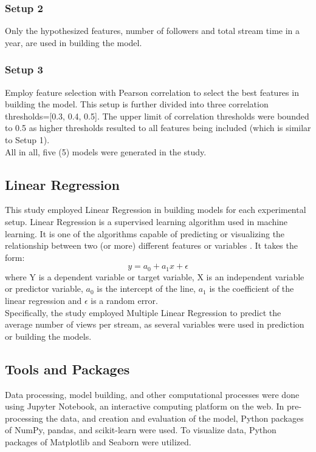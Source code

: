 \documentclass[runningheads]{llncs}
\begin{document}
\subsubsection{Setup 2} Only the hypothesized features, number of followers and total stream time in a year, are used in building the model.

\subsubsection{Setup 3} Employ feature selection with Pearson correlation to select the best features in building the model. This setup is further divided into three correlation thresholds=[0.3, 0.4, 0.5]. The upper limit of correlation thresholds were bounded to 0.5 as higher thresholds resulted to all features being included (which is similar to Setup 1). \\

All in all, five (5) models were generated in the study. 

\subsection{Linear Regression}
This study employed Linear Regression in building models for each experimental setup. Linear Regression is a supervised learning algorithm used in machine learning. It is one of the algorithms capable of predicting or visualizing the relationship between two (or more) different features or variables \cite{nelson_2021}. It takes the form:
\begin{equation}y=a_0+a_1x+\epsilon\end{equation}
where Y is a dependent variable or target variable, X is an independent variable or predictor variable, $a_0$ is the intercept of the line, $a_1$ is the coefficient of the linear regression and $\epsilon$ is a random error.  \\

Specifically, the study employed Multiple Linear Regression to predict the average number of views per stream, as several variables were used in prediction or building the models.


\subsection{Tools and Packages}
Data processing, model building, and other computational processes were done using Jupyter Notebook, an interactive computing platform on the web. In pre-processing the data, and creation and evaluation of the model, Python packages of NumPy, pandas, and scikit-learn were used. To visualize data, Python packages of Matplotlib and Seaborn were utilized.\\
\end{document}
